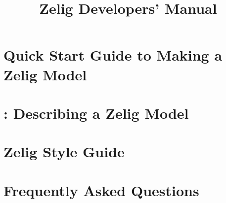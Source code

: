 \documentclass{book}
\title{Zelig Developers' Manual \code{v4.0-10}}
\begin{document}
\maketitle


\tableofcontents


\chapter[Quick Start Guide]{Quick Start Guide to Making a Zelig Model}
\label{chapter:quickstart}



% 


\chapter[\code{describe}]{: Describing a Zelig Model}
\label{chapter:describe}



\chapter[\code{zelig2}]{}
\label{chapter:zelig2}



\chapter[\code{param}]{}
\label{chapter:param}



\chapter[\code{qi}]{}
\label{chapter:qi}



\chapter[Zelig Style Guide]{Zelig Style Guide}
\label{chapter:styleguide}


\chapter[FAQ]{Frequently Asked Questions}
\label{chapter:faq}

\end{document}
